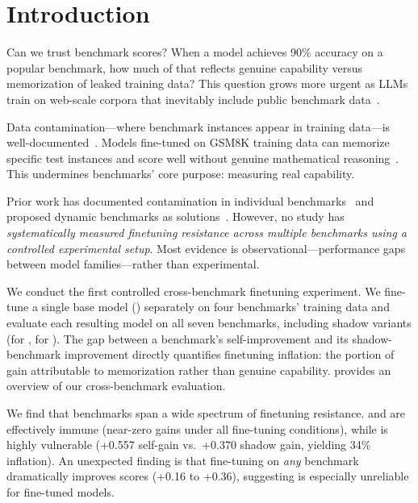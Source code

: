 \section{Introduction}
\label{sec:intro}

Can we trust benchmark scores? When a model achieves 90\% accuracy on a popular benchmark, how much of that reflects genuine capability versus memorization of leaked training data? This question grows more urgent as LLMs train on web-scale corpora that inevitably include public benchmark data~\citep{zhang2024gsm1k, white2024livebench}.

 Data contamination---where benchmark instances appear in training data---is well-documented~\citep{zhang2024gsm1k, zhu2024contamination_survey}. Models fine-tuned on GSM8K training data can memorize specific test instances and score well without genuine mathematical reasoning~\citep{mirzadeh2025gsmsymbolic}. This undermines benchmarks' core purpose: measuring real capability.

 Prior work has documented contamination in individual benchmarks~\citep{zhang2024gsm1k} and proposed dynamic benchmarks as solutions~\citep{white2024livebench, zhu2023dyval}. However, no study has \emph{systematically measured finetuning resistance across multiple benchmarks using a controlled experimental setup}. Most evidence is observational---performance gaps between model families---rather than experimental.

 We conduct the first controlled cross-benchmark finetuning experiment. We fine-tune a single base model (\qwen) separately on four benchmarks' training data and evaluate each resulting model on all seven benchmarks, including shadow variants (\gsmsym for \gsmk, \mmlupro for \mmlu). The gap between a benchmark's self-improvement and its shadow-benchmark improvement directly quantifies finetuning inflation: the portion of gain attributable to memorization rather than genuine capability.  provides an overview of our cross-benchmark evaluation.

 We find that benchmarks span a wide spectrum of finetuning resistance. \gpqa and \mmlupro are effectively immune (near-zero gains under all fine-tuning conditions), while \gsmk is highly vulnerable (+0.557 self-gain vs.\ +0.370 shadow gain, yielding 34\% inflation). An unexpected finding is that fine-tuning on \emph{any} benchmark dramatically improves \gsmk scores (+0.16 to +0.36), suggesting \gsmk is especially unreliable for fine-tuned models.

